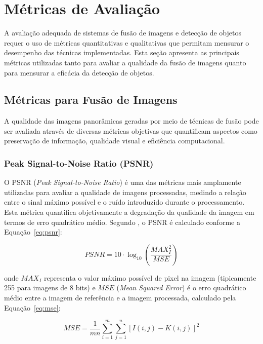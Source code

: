 \section{Métricas de Avaliação}

A avaliação adequada de sistemas de fusão de imagens e detecção de objetos requer o uso de métricas quantitativas e qualitativas que permitam mensurar o desempenho das técnicas implementadas. Esta seção apresenta as principais métricas utilizadas tanto para avaliar a qualidade da fusão de imagens quanto para mensurar a eficácia da detecção de objetos.

\subsection{Métricas para Fusão de Imagens}

A qualidade das imagens panorâmicas geradas por meio de técnicas de fusão pode ser avaliada através de diversas métricas objetivas que quantificam aspectos como preservação de informação, qualidade visual e eficiência computacional.

\subsubsection{Peak Signal-to-Noise Ratio (PSNR)}

O PSNR (\textit{Peak Signal-to-Noise Ratio}) é uma das métricas mais amplamente utilizadas para avaliar a qualidade de imagens processadas, medindo a relação entre o sinal máximo possível e o ruído introduzido durante o processamento. Esta métrica quantifica objetivamente a degradação da qualidade da imagem em termos de erro quadrático médio. Segundo \cite{wang2004image}, o PSNR é calculado conforme a Equação~\ref{eq:psnr}:

\begin{equation}
\label{eq:psnr}
PSNR = 10 \cdot \log_{10}\left(\frac{MAX^2_I}{MSE}\right)
\end{equation}

\noindent onde $MAX_I$ representa o valor máximo possível de pixel na imagem (tipicamente 255 para imagens de 8 bits) e $MSE$ (\textit{Mean Squared Error}) é o erro quadrático médio entre a imagem de referência e a imagem processada, calculado pela Equação~\ref{eq:mse}:

\begin{equation}
\label{eq:mse}
MSE = \frac{1}{mn} \sum_{i=1}^{m}\sum_{j=1}^{n}[I(i,j) - K(i,j)]^2
\end{equation}

